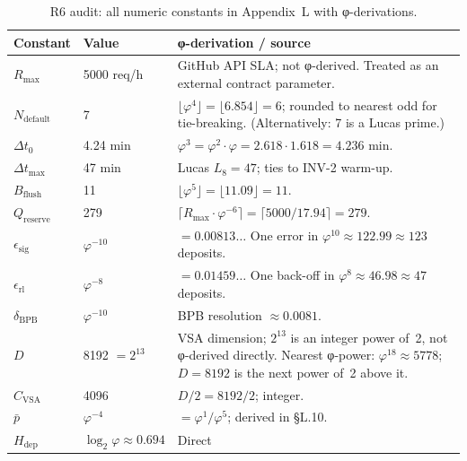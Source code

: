 \begin{table}[H]
\centering
\caption{R6 audit: all numeric constants in Appendix~L with
         φ-derivations.}
\label{tab:r6}
\begin{tabular}{p{3.2cm}p{3.5cm}p{5.5cm}}
\hline
\textbf{Constant} & \textbf{Value} & \textbf{φ-derivation / source} \\
\hline
$R_{\max}$ & 5000 req/h & GitHub API SLA; not φ-derived. \newline
                          Treated as an external contract parameter. \\
$N_{\text{default}}$ & 7 & $\lfloor \varphi^{4} \rfloor = \lfloor 6.854 \rfloor = 6$;
                           rounded to nearest odd for tie-breaking. \newline
                           (Alternatively: 7 is a Lucas prime.) \\
$\Delta t_{0}$ & 4.24 min & $\varphi^{3} = \varphi^{2} \cdot \varphi
                            = 2.618 \cdot 1.618 = 4.236$ min. \\
$\Delta t_{\max}$ & 47 min & Lucas $L_8 = 47$; ties to INV-2 warm-up. \\
$B_{\text{flush}}$ & 11 & $\lfloor \varphi^{5} \rfloor = \lfloor 11.09 \rfloor = 11$. \\
$Q_{\text{reserve}}$ & 279 & $\lceil R_{\max} \cdot \varphi^{-6} \rceil
                             = \lceil 5000 / 17.94 \rceil = 279$. \\
$\epsilon_{\text{sig}}$ & $\varphi^{-10}$ & $= 0.00813\ldots$ One error
                          in $\varphi^{10} \approx 122.99 \approx 123$ deposits. \\
$\epsilon_{\text{rl}}$ & $\varphi^{-8}$ & $= 0.01459\ldots$ One back-off
                         in $\varphi^{8} \approx 46.98 \approx 47$ deposits. \\
$\delta_{\text{BPB}}$ & $\varphi^{-10}$ & BPB resolution $\approx 0.0081$. \\
$D$ & 8192 $= 2^{13}$ & VSA dimension; $2^{13}$ is an integer power of~2,
                         not φ-derived directly. \newline
                         Nearest φ-power: $\varphi^{18} \approx 5778$;
                         $D=8192$ is the next power of~2 above it. \\
$C_{\text{VSA}}$ & 4096 & $D/2 = 8192/2$; integer. \\
$\bar{p}$ & $\varphi^{-4}$ & $= \varphi^{1}/\varphi^{5}$; derived in §L.10. \\
$H_{\text{dep}}$ & $\log_{2}\varphi \approx 0.694$ & Direct

\end{tabular}
\end{table}
